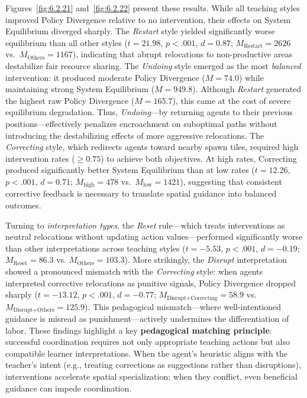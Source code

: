 \documentclass[10pt,letterpaper]{article}
\begin{document}
 Figures~\ref{fig:6.2.21} and~\ref{fig:6.2.22} present these results. While all teaching styles improved Policy Divergence relative to no intervention, their effects on System Equilibrium diverged sharply. The \textit{Restart} style yielded significantly worse equilibrium than all other styles ($t = 21.98$, $p < .001$, $d = 0.87$; $M_{\text{Restart}} = 2626$ vs.\ $M_{\text{Others}} = 1167$), indicating that abrupt relocations to non-productive areas destabilize fair resource sharing. The \textit{Undoing} style emerged as the most \textit{balanced} intervention: it produced moderate Policy Divergence ($M = 74.0$) while maintaining strong System Equilibrium ($M = 949.8$). Although \textit{Restart} generated the highest raw Policy Divergence ($M = 165.7$), this came at the cost of severe equilibrium degradation. Thus, \textit{Undoing}---by returning agents to their previous positions---effectively penalizes encroachment on suboptimal paths without introducing the destabilizing effects of more aggressive relocations. The \textit{Correcting} style, which redirects agents toward nearby spawn tiles, required high intervention rates ($\geq 0.75$) to achieve both objectives. At high rates, Correcting produced significantly better System Equilibrium than at low rates ($t = 12.26$, $p < .001$, $d = 0.71$; $M_{\text{high}} = 478$ vs.\ $M_{\text{low}} = 1421$), suggesting that consistent corrective feedback is necessary to translate spatial guidance into balanced outcomes.             
     
 Turning to \emph{interpretation types}, the \textit{Reset} rule---which treats interventions as neutral relocations without updating action values---performed significantly worse than other interpretations across teaching styles ($t = -5.53$, $p < .001$, $d = -0.19$; $M_{\text{Reset}} = 86.3$ vs.  $M_{\text{Others}} = 103.3$). More strikingly, the \textit{Disrupt} interpretation showed a pronounced mismatch with the \textit{Correcting} style: when agents interpreted corrective relocations as punitive signals, Policy Divergence dropped sharply ($t = -13.12$, $p < .001$, $d = -0.77$;                
 $M_{\text{Disrupt+Correcting}} = 58.9$ vs.\ $M_{\text{Disrupt+Others}} = 125.9$). This pedagogical mismatch---where well-intentioned guidance is misread as punishment---actively undermines the differentiation of labor.                                                                                            
 These findings highlight a key \textbf{pedagogical matching principle}: successful coordination requires not only appropriate teaching actions but also compatible learner interpretations. When the agent's heuristic aligns with the teacher's intent (e.g., treating corrections as suggestions rather than disruptions), interventions accelerate spatial specialization; when they conflict, even beneficial guidance can impede coordination.        
\end{document}
